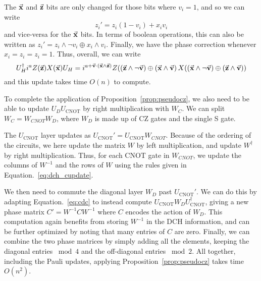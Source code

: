 The $\va{x}$ and $\va{z}$ bits are only changed for those bits where $v_{i}=1$, and so we can write
\[z_{i}' = z_{i}(1-v_{i}) + x_{i}v_{i}\]
and vice-versa for the $\va{x}$ bits. In terms of boolean operations, this can also be written as $z_{i}'= z_{i}\wedge\neg v_{i} \oplus x_{i}\wedge v_{i}$. Finally, we have the phase correction whenever $x_{i}=z_{i}=z_{i}=1$. Thus, overall, we can write
\begin{equation}
U_{H}^{\dagger}i^{a}Z(\va{z})X(\va{x})U_{H} = i^{a+\va{v}\cdot\left(\va{x}\wedge \va{z}\right)}Z(\left(\va{z}\wedge\neg \va{v}\right) \oplus \left(\va{x}\wedge \va{v}\right)X(\left(\va{x}\wedge \neg\va{v}\right)\oplus \left(\va{z}\wedge\va{v}\right))
\label{eq:dch_hupdate}
\end{equation}
and this update takes time $O(n)$ to compute.\par
To complete the application of Proposition~\ref{prop:pseudocz}, we also need to be able to update $U_{D}U_{\text{CNOT}}$ by right multiplication with $W_{C}$. We can split $W_{C}=W_{CNOT}W_{D}$, where $W_{D}$ is made up of CZ gates and the single S gate.\par
The $U_{\text{CNOT}}$ layer updates as $U_{\text{CNOT}}'=U_{\text{CNOT}}W_{CNOT}$. Because of the ordering of the circuits, we here update the matrix $W$ by left multiplication, and update $W^{\dagger}$ by right multiplication. Thus, for each CNOT gate in $W_{CNOT}$, we update the columns of $W^{-1}$ and the rows of $W$ using the rules given in Equation.~\ref{eq:dch_cupdate}.\par
We then need to commute the diagonal layer $W_{D}$ past $U_{\text{CNOT}}'$. We can do this by adapting Equation.~\ref{eq:cdc} to instead compute $U_{\text{CNOT}}W_{D}U_{\text{CNOT}}^{\dagger}$, giving a new phase matrix $C'=W^{-1}CW^{-1}$ where $C$ encodes the action of $W_{D}$. This computation again benefits from storing $W^{-1}$ in the DCH information, and can be further optimized by noting that many entries of $C$ are zero. Finally, we can combine the two phase matrices by simply adding all the elements, keeping the diagonal entries $\bmod 4$ and the off-diagonal entries $\bmod 2$. All together, including the Pauli updates, applying Proposition~\ref{prop:pseudocz} takes time $O(n^2)$.
